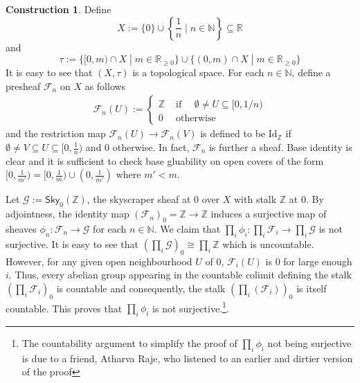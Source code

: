 \documentclass[oneside,11pt]{amsart}
\theoremstyle{definition}
\newtheorem{const}[thm]{Construction}
\theoremstyle{remark}
\begin{document}
\begin{const}\label{const1}
	Define $$X:=\{ 0 \} \cup \left\{ \frac{1}{n} \;|\;n\in \mathbb{N}  \right\} \subseteq \mathbb{R} $$ 
and
$$ \tau:=\{ [0,m)\cap X\;|\;m\in \mathbb{R}_{\geqslant 0} \} \cup \{ (0,m)\cap X\;|\;m\in \mathbb{R}_{\geqslant 0}  \}   $$
It is easy to see that $(X,\tau)$ is a topological space. For each $n\in \mathbb{N} $, define a presheaf $\mathscr{F}_{n}$ on $X$ as follows
\begin{align*}
\mathscr{F}_{n}(U):=\begin{cases}
	\mathbb{Z}  &\text{ if } \quad \emptyset \neq U\subseteq [0,1/n) \\
	0  & \text{ otherwise} 
\end{cases}
\end{align*}
and the restriction map $\mathscr{F}_{n}(U)\rightarrow \mathscr{F}_{n}(V) $ is defined to be $\text{Id}_{\mathbb{Z} }$ if $\emptyset \neq V \subseteq U\subseteq [0,\frac{1}{n})$ and $0$ otherwise. In fact, $\mathscr{F}_{n}$ is further a sheaf. Base identity is clear and it is sufficient to check base gluability on open covers of the form $[0,\frac{1}{m'})=[0,\frac{1}{m})\cup (0,\frac{1}{m'})$ where $m'<m$.

Let $\mathscr{G}:=\textsf{Sky}_{0}(\mathbb{Z} ) $, the skyscraper sheaf at $0$ over $X$ with stalk $\mathbb{Z} $ at $0$. By adjointness, the identity map $(\mathscr{F}_{n})_{0}= \mathbb{Z}  \rightarrow \mathbb{Z} $ induces a surjective map of sheaves $\phi _{n}:\mathscr{F}_{n}\rightarrow \mathscr{G} $ for each $n\in \mathbb{N} $. We claim that $\prod_{i}\phi _{i}: \prod_{i}\mathscr{F}_{i} \rightarrow \prod_{i}\mathscr{G}   $ is not surjective.   It is easy to see that $(\prod_{i}\mathscr{G})_{0}\cong \prod_{i}\mathbb{Z} $ which is uncountable. However, for any given open neighbourhood $U$ of $0$, $\mathscr{F}_{i}(U)$ is $0$ for large enough $i$. Thus, every abelian group appearing in the countable colimit defining the stalk $(\prod_{i}\mathscr{F}_{i})_{0}$ is countable and consequently, the stalk $(\prod_{i}(\mathscr{F}_{i} ))_{0}$ is itself countable. This proves that $\prod_{i}\phi _{i}$ is not surjective.\footnote{The countability argument to simplify the proof of $\prod_{i}\phi _{i}$ not being surjective is due to a friend, Atharva Raje, who listened to an earlier and dirtier version of the proof}.     
\end{const}
\end{document}
